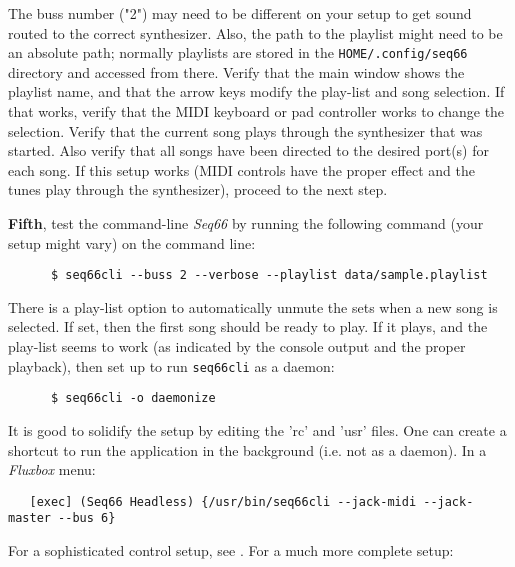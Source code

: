    The buss number ("2") may need to be different on your setup to get sound
   routed to the correct synthesizer.
   Also, the path to the playlist might
   need to be an absolute path; normally playlists are stored in the
   \texttt{HOME/.config/seq66} directory and accessed from there.
   Verify that the main window shows the playlist name,
   and that the arrow keys modify the
   play-list and song selection.
   If that works, verify that the MIDI keyboard
   or pad controller works to change the selection.
   Verify that the current
   song plays through the synthesizer that was started.
   Also verify that all
   songs have been directed to the desired port(s) for each song.
   If this setup works (MIDI controls have the proper effect and the tunes play
   through the synthesizer), proceed to the next step.

   \textbf{Fifth}, test the command-line \textsl{Seq66} by running the
   following command (your setup might vary) on the command line:

   \begin{verbatim}
      $ seq66cli --buss 2 --verbose --playlist data/sample.playlist
   \end{verbatim}

   There is a play-list option to automatically unmute the sets when a new song
   is selected.  If set, then the first song should be ready to play.
   If it plays, and the play-list seems to work (as indicated by the console
   output and the proper playback), then set up to run \texttt{seq66cli}
   as a daemon:

   \begin{verbatim}
      $ seq66cli -o daemonize
   \end{verbatim}


   It is good to solidify the setup by editing the 'rc' and 'usr' files.
   One can create a shortcut to run the application in the background (i.e. not
   as a daemon).
   In a \textsl{Fluxbox} menu:

   \begin{verbatim}
   [exec] (Seq66 Headless) {/usr/bin/seq66cli --jack-midi --jack-master --bus 6}
   \end{verbatim}

   For a sophisticated control setup, see .
   For a much more complete setup:

